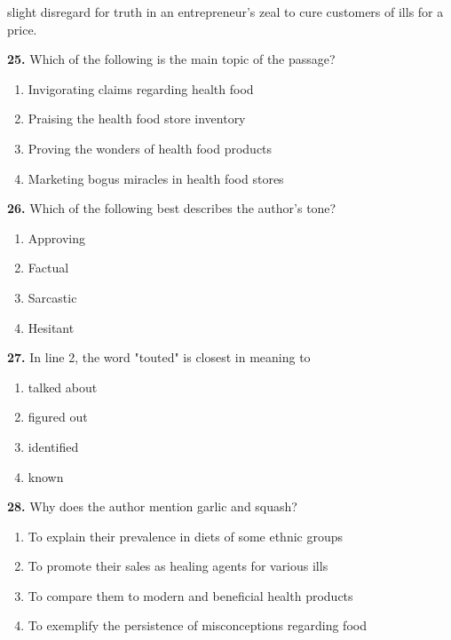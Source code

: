 \documentclass[12pt]{article}
\begin{document}
slight disregard for truth in an entrepreneur's zeal to cure customers of ills for a price.\par
\endgroup
\medskip
\noindent\textbf{25.} Which of the following is the main topic of the passage?
\begin{enumerate}[label=(\Alph*),leftmargin=*,itemsep=0.2em]
\item Invigorating claims regarding health food
\item Praising the health food store inventory
\item Proving the wonders of health food products
\item Marketing bogus miracles in health food stores
\end{enumerate}
\par
\vspace{0.25\baselineskip}
\noindent\textbf{26.} Which of the following best describes the author's tone?
\begin{enumerate}[label=(\Alph*),leftmargin=*,itemsep=0.2em]
\item Approving
\item Factual
\item Sarcastic
\item Hesitant
\end{enumerate}
\par
\vspace{0.25\baselineskip}
\noindent\textbf{27.} In line 2, the word "touted" is closest in meaning to
\begin{enumerate}[label=(\Alph*),leftmargin=*,itemsep=0.2em]
\item talked about
\item figured out
\item identified
\item known
\end{enumerate}
\par
\vspace{0.25\baselineskip}
\noindent\textbf{28.} Why does the author mention garlic and squash?
\begin{enumerate}[label=(\Alph*),leftmargin=*,itemsep=0.2em]
\item To explain their prevalence in diets of some ethnic groups
\item To promote their sales as healing agents for various ills
\item To compare them to modern and beneficial health products
\item To exemplify the persistence of misconceptions regarding food
\end{enumerate}
\end{document}
